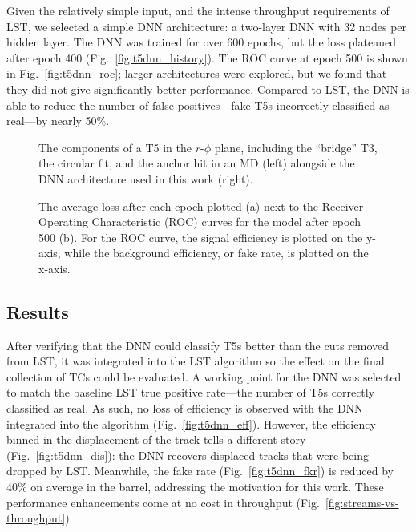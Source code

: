 Given the relatively simple input, and the intense throughput requirements of LST, we selected a simple DNN architecture: a two-layer DNN with 32 nodes per hidden layer. 
The DNN was trained for over 600 epochs, but the loss plateaued after epoch 400 (Fig.~\ref{fig:t5dnn_history}). 
The ROC curve at epoch 500 is shown in Fig.~\ref{fig:t5dnn_roc}; larger architectures were explored, but we found that they did not give significantly better performance. 
Compared to LST, the DNN is able to reduce the number of false positives---fake T5s incorrectly classified as real---by nearly 50\%. 

\begin{figure}[!htb]
    \centering
    \qquad
    \caption[The components of a T5 and the DNN architecture]{
        The components of a T5 in the $r$-$\phi$ plane, including the ``bridge'' T3, the circular fit, and the anchor hit in an MD (left) alongside the DNN architecture used in this work (right). 
    }
\end{figure}

\begin{figure}[!htb]
    \centering
    \qquad
    \caption[The average loss after each epoch and ROC curve for the DNN]{
        The average loss after each epoch plotted (a) next to the Receiver Operating Characteristic (ROC) curves for the model after epoch 500 (b). 
        For the ROC curve, the signal efficiency is plotted on the y-axis, while the background efficiency, or fake rate, is plotted on the x-axis. 
    }
\end{figure}

\subsection{Results}
After verifying that the DNN could classify T5s better than the cuts removed from LST, it was integrated into the LST algorithm so the effect on the final collection of TCs could be evaluated. 
A working point for the DNN was selected to match the baseline LST true positive rate---the number of T5s correctly classified as real. 
As such, no loss of efficiency is observed with the DNN integrated into the algorithm (Fig.~\ref{fig:t5dnn_eff}). 
However, the efficiency binned in the displacement of the track tells a different story (Fig.~\ref{fig:t5dnn_dis}): the DNN recovers displaced tracks that were being dropped by LST. 
Meanwhile, the fake rate (Fig.~\ref{fig:t5dnn_fkr}) is reduced by 40\% on average in the barrel, addressing the motivation for this work. 
These performance enhancements come at no cost in throughput (Fig.~\ref{fig:streams-vs-throughput}).

